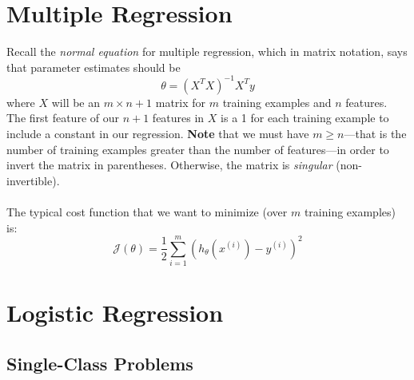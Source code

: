 \documentclass[12pt]{article}
\begin{document}
\section{Multiple Regression}

Recall the \emph{normal equation} for multiple regression, which
in matrix notation, says that parameter estimates should be
   \[ \theta = (X^T X)^{-1} X^T y\]
where $X$ will be an $m\times n+1$ matrix for $m$ training examples
and $n$ features.  The first feature of our $n+1$ features in $X$
is a 1 for each training example to include a constant in our
regression.
\textbf{Note}
that we must have $m\geq n$---that is the number of training
examples greater than the number of features---in order to invert
the matrix in parentheses. Otherwise, the matrix is
\emph{singular} (non-invertible).
\\
\\
The typical cost function that we want to minimize (over $m$
training examples) is:
\begin{equation}
   \label{cost}
   \mathcal{J}(\theta) = \frac{1}{2} \sum^m_{i=1} (h_\theta(x^{(i)}) -
      y^{(i)})^2
\end{equation}


\section{Logistic Regression}

\subsection{Single-Class Problems}
\end{document}
